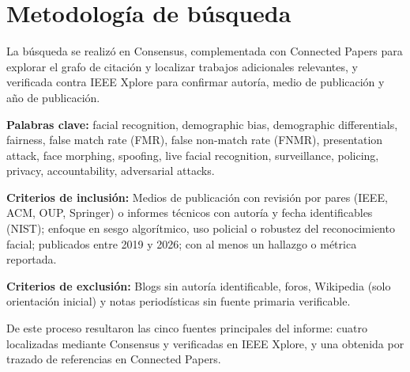 %
\section{Metodología de búsqueda}
\label{sec:metodologia}

La búsqueda se realizó en Consensus, complementada con
Connected Papers para explorar el grafo de citación y
localizar trabajos adicionales relevantes, y verificada contra
IEEE Xplore para confirmar autoría, medio de publicación y año de
publicación.

\textbf{Palabras clave:} facial recognition, demographic bias,
demographic differentials, fairness, false match rate (FMR), false
non-match rate (FNMR), presentation attack, face morphing, spoofing,
live facial recognition, surveillance, policing, privacy,
accountability, adversarial attacks.

\textbf{Criterios de inclusión:} Medios de publicación con revisión por pares (IEEE,
ACM, OUP, Springer) o informes técnicos con autoría y fecha
identificables (NIST); enfoque en sesgo algorítmico, uso policial o
robustez del reconocimiento facial; publicados entre 2019 y 2026;
con al menos un hallazgo o métrica reportada.

\textbf{Criterios de exclusión:} Blogs sin autoría identificable,
foros, Wikipedia (solo orientación inicial) y notas periodísticas sin
fuente primaria verificable.

De este proceso resultaron las cinco fuentes principales del informe:
cuatro localizadas mediante Consensus y verificadas en IEEE Xplore, y
una obtenida por trazado de referencias en Connected Papers.